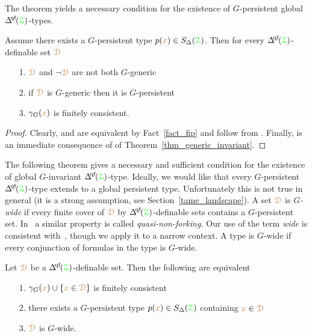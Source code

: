 The theorem yields a necessary condition for the existence of $G$-persistent global $\qfDelta({\grZ})$-types.

\begin{corollary}\label{corol_def_mu}
  Assume there exists a $G$-persistent type $p({\color{brown} x})\in S_\Delta({\color{green}\EuScript Z})$.
  Then for every $\qfDelta({\grZ})$-definable set ${\color{brown}\EuScript D}$
  \begin{itemize}
    \item[1.] ${\color{brown}\EuScript D}$ and $\neg{\color{brown}\EuScript D}$ are not both $G$-generic
    \item[2.] if ${\color{brown}\EuScript D}$ is $G$-generic then it is $G$-persistent
    \item[3.] $\gamma_G({\color{brown} x})$ is finitely consistent.
  \end{itemize}
\end{corollary}

\begin{proof}
  Clearly,  and  are equivalent by Fact~\ref{fact_fip} and follow from .
  Finally,  is an immediate consequence of  of Theorem~\ref{thm_generic_invariant}.
\end{proof}

The following theorem gives a necessary and sufficient condition for the  existence of global $G$-invariant $\qfDelta({\grZ})$-type.
Ideally, we would like that every $G$-persistent $\qfDelta({\grZ})$-type extends to a global persistent type.
Unfortunately this is not true in general (it is a strong assumption, see Section~\ref{tame_landscape}).
A set ${\color{brown}\EuScript D}$ is \emph{$G$-wide\/} if every finite cover of ${\color{brown}\EuScript D}$ by $\qfDelta({\grZ})$-definable sets contains a $G$-persistent set.
In~\cite{CK} a similar property is called \textit{quasi-non-forking.}
Our use of the term \textit{wide\/} is consistent with~\cite{Hr}, though we apply it to a narrow context.
A type is $G$-wide if every conjunction of formulas in the type is $G$-wide.

\begin{theorem}\label{thm_generic_invariant2}
  Let ${\color{brown}\EuScript D}$ be a $\qfDelta(\grZ)$-definable set.
  Then the following are equivalent 
  \begin{itemize}
    \item[1.] $\gamma_G({\color{brown} x})\cup\{{\color{brown} x}\in{\color{brown}\EuScript D}\}$ is finitely consistent
    \item[2.] there exists a $G$-persistent type $p({\color{brown} x})\in S_\Delta({\color{green}\EuScript Z})$ containing ${\color{brown} x}\in{\color{brown}\EuScript D}$
    \item[3.] ${\color{brown}\EuScript D}$ is $G$-wide.
  \end{itemize}
\end{theorem}

